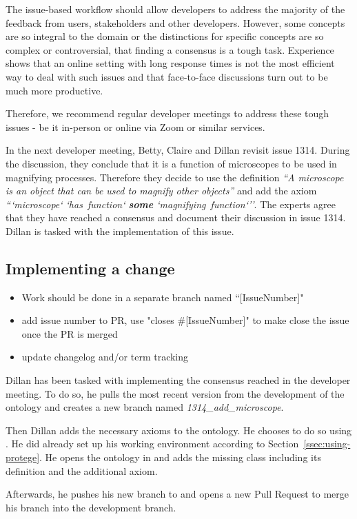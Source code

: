 The issue-based workflow should allow developers to address the majority of the feedback from users, stakeholders and other developers. However, some concepts are so integral to the domain or the distinctions for specific concepts are so complex or controversial, that finding a consensus is a tough task. Experience shows that an online setting with long response times is not the most efficient way to deal with such issues and that face-to-face discussions turn out to be much more productive.

Therefore, we recommend regular developer meetings to address these tough issues - be it in-person or online via Zoom or similar services. 

\begin{example}
In the next developer meeting, Betty, Claire and Dillan revisit issue 1314. During the discussion, they conclude that it is a function of microscopes to be used in magnifying processes. Therefore they decide to use the definition \emph{``A microscope is an object that can be used to magnify other objects''} and add the axiom
\emph{```microscope` `has~function` \textbf{some} `magnifying~function`''}.
The experts agree that they have reached a consensus and document their discussion in issue 1314. Dillan is tasked with the implementation of this issue.
\end{example}

\subsection{Implementing a change}
\begin{itemize}
    \item  Work should be done in a separate branch named ``[IssueNumber]"
    \item add issue number to PR, use "closes \#[IssueNumber]" to make {\github} close the issue once the PR is merged
    \item update changelog and/or term tracking
\end{itemize}

\begin{example}
Dillan has been tasked with implementing the consensus reached in the developer meeting. To do so, he pulls the most recent version from the development of the ontology and creates a new branch named \textit{1314\_add\_microscope}.

Then Dillan adds the necessary axioms to the ontology. He chooses to do so using {\protege}. He did already set up his working environment according to Section~\ref{ssec:using-protege}. He opens the ontology in {\protege} and adds the missing class including its definition and the additional axiom.

Afterwards, he pushes his new branch to {\github} and opens a new Pull Request to merge his branch into the development branch.
\end{example}

